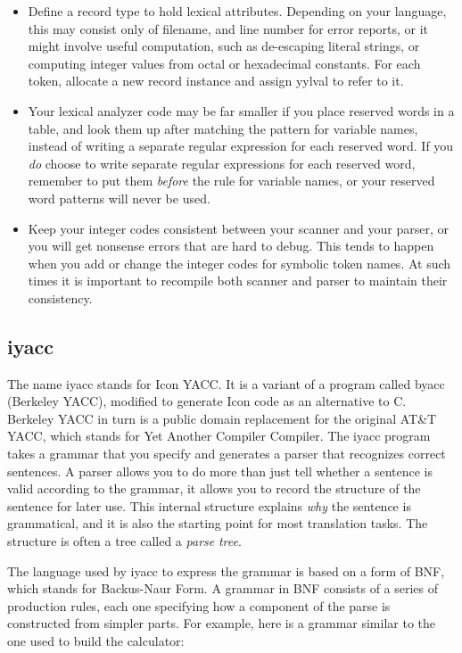 \liststyleLvii
\begin{itemize}
\item Define a record type to hold lexical attributes. Depending on your
language, this may consist only of filename, and line number for error
reports, or it might involve useful computation, such as de-escaping
literal strings, or computing integer values from octal or hexadecimal
constants. For each token, allocate a new record instance and assign
\textsf{yylval} to refer to it.
\item Your lexical analyzer code may be far smaller if you place reserved
words in a table, and look them up after matching the pattern for
variable names, instead of writing a separate regular expression for
each reserved word. If you \textit{do} choose to write separate regular
expressions for each reserved word, remember to put them
\textit{before} the rule for variable names, or your reserved word
patterns will never be used.
\item Keep your integer codes consistent between your scanner and your
parser, or you will get nonsense errors that are hard to debug. This
tends to happen when you add or change the integer codes for symbolic
token names. At such times it is important to recompile both scanner
and parser to maintain their consistency.
\end{itemize}

\subsection{iyacc}

The name \textsf{iyacc} stands for Icon YACC. It is a variant of a
program called \textsf{byacc} (Berkeley YACC), modified to
generate Icon code as an alternative to C. Berkeley YACC in turn is a
public domain replacement for the original AT\&T YACC, which stands for
Yet Another Compiler Compiler. The \textsf{iyacc} program takes a
grammar that you specify and
generates a parser that recognizes correct sentences. A parser allows
you to do more than just tell whether a sentence is valid according to
the grammar, it allows you to record the structure of the sentence for
later use. This internal structure explains \textit{why} the sentence
is grammatical, and it is also the starting point for most translation
tasks. The structure is often a tree called a \textit{parse }\textit{tree}.

The language used by \textsf{iyacc} to express the grammar is based on a
form of BNF, which stands for Backus-Naur Form. A grammar in BNF consists of a series of
production rules, each one specifying how a component of the parse is
constructed from simpler parts. For example, here is a grammar similar
to the one used to build the calculator:

